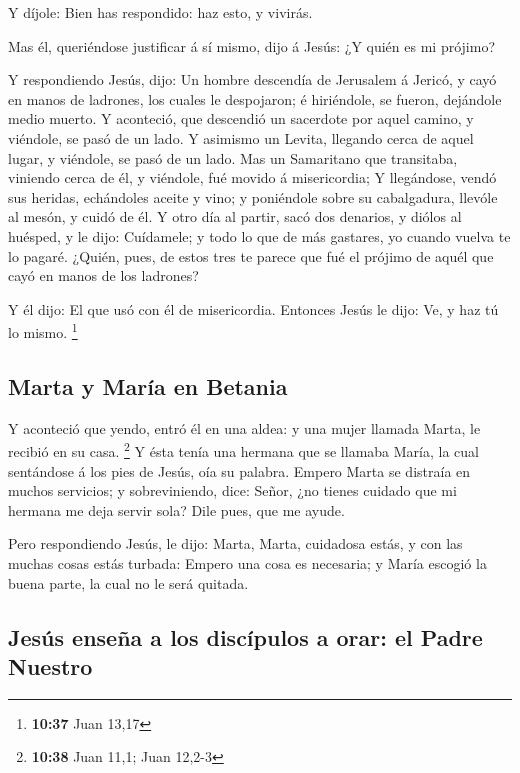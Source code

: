  Y díjole: Bien has respondido: haz esto, y vivirás.

 Mas él, queriéndose justificar á sí mismo, dijo á Jesús:
¿Y quién es mi prójimo?

 Y respondiendo Jesús, dijo: Un hombre descendía de
Jerusalem á Jericó, y cayó en manos de ladrones, los cuales le
despojaron; é hiriéndole, se fueron, dejándole medio muerto.
 Y aconteció, que descendió un sacerdote por aquel
camino, y viéndole, se pasó de un lado.  Y asimismo un
Levita, llegando cerca de aquel lugar, y viéndole, se pasó de un lado.
 Mas un Samaritano que transitaba, viniendo cerca de él,
y viéndole, fué movido á misericordia;  Y llegándose,
vendó sus heridas, echándoles aceite y vino; y poniéndole sobre su
cabalgadura, llevóle al mesón, y cuidó de él.  Y otro día
al partir, sacó dos denarios, y diólos al huésped, y le dijo: Cuídamele;
y todo lo que de más gastares, yo cuando vuelva te lo pagaré.
 ¿Quién, pues, de estos tres te parece que fué el prójimo
de aquél que cayó en manos de los ladrones?

 Y él dijo: El que usó con él de misericordia. Entonces
Jesús le dijo: Ve, y haz tú lo mismo. \footnote{\textbf{10:37} Juan
  13,17}

\hypertarget{marta-y-maruxeda-en-betania}{%
\subsection{Marta y María en
Betania}\label{marta-y-maruxeda-en-betania}}

 Y aconteció que yendo, entró él en una aldea: y una
mujer llamada Marta, le recibió en su casa. \footnote{\textbf{10:38}
  Juan 11,1; Juan 12,2-3}  Y ésta tenía una hermana que
se llamaba María, la cual sentándose á los pies de Jesús, oía su
palabra.  Empero Marta se distraía en muchos servicios; y
sobreviniendo, dice: Señor, ¿no tienes cuidado que mi hermana me deja
servir sola? Dile pues, que me ayude.

 Pero respondiendo Jesús, le dijo: Marta, Marta,
cuidadosa estás, y con las muchas cosas estás turbada: 
Empero una cosa es necesaria; y María escogió la buena parte, la cual no
le será quitada.

\hypertarget{jesuxfas-enseuxf1a-a-los-discuxedpulos-a-orar-el-padre-nuestro}{%
\subsection{Jesús enseña a los discípulos a orar: el Padre
Nuestro}\label{jesuxfas-enseuxf1a-a-los-discuxedpulos-a-orar-el-padre-nuestro}}

